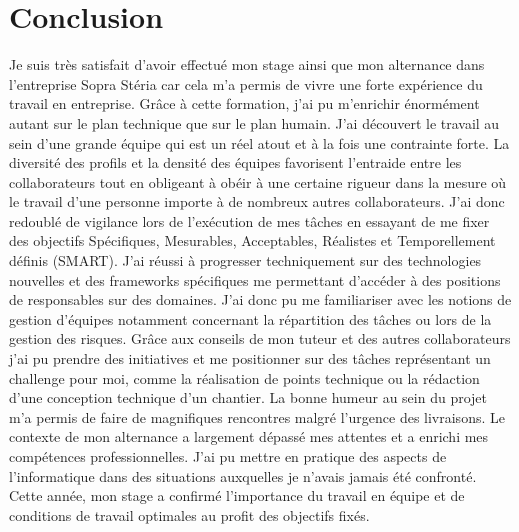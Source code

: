 \documentclass[12pt,a4paper]{article}
\begin{document}
\section{Conclusion}
Je suis très satisfait d’avoir effectué mon stage ainsi que mon alternance dans l'entreprise Sopra Stéria car cela m’a permis de vivre une forte expérience du travail en entreprise. Grâce à cette formation, j’ai pu m’enrichir énormément autant sur le plan technique que sur le plan humain.
\medbreak
J’ai découvert le travail au sein d'une grande équipe qui est un réel atout et à la fois une contrainte forte. La diversité des profils et la densité des équipes favorisent l'entraide entre les collaborateurs tout en obligeant à obéir à une certaine rigueur dans la mesure où le travail d'une personne importe à de nombreux autres collaborateurs. J’ai donc redoublé de vigilance lors de l’exécution de mes tâches en essayant de me fixer des objectifs Spécifiques, Mesurables, Acceptables, Réalistes et Temporellement définis (SMART).
\medbreak
J'ai réussi à progresser techniquement sur des technologies nouvelles et des frameworks spécifiques me permettant d'accéder à des positions de responsables sur des domaines. J'ai donc pu me familiariser avec les notions de gestion d'équipes notamment concernant la répartition des tâches ou lors de la gestion des risques. Grâce aux conseils de mon tuteur et des autres collaborateurs j'ai pu prendre des initiatives et me positionner sur des tâches représentant un challenge pour moi, comme la réalisation de points technique ou la rédaction d'une conception technique d'un chantier. \bigbreak
La bonne humeur au sein du projet m'a permis de faire de magnifiques rencontres malgré l’urgence des livraisons. Le contexte de mon alternance a largement dépassé mes attentes et a enrichi mes compétences professionnelles. J'ai pu mettre en pratique des aspects de l'informatique dans des situations auxquelles je n'avais jamais été confronté.
Cette année, mon stage a confirmé l'importance du travail en équipe et de conditions de travail optimales au profit des objectifs fixés.
\end{document}

